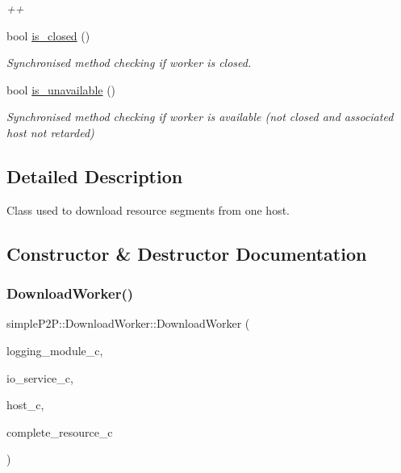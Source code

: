 \begin{DoxyCompactItemize}
\begin{DoxyCompactList}\small\item\em ++ \end{DoxyCompactList}\item 
\mbox{\label{classsimpleP2P_1_1DownloadWorker_a5e46b7b54882ef35bfaf48b51573a96e}} 
bool \hyperlink{classsimpleP2P_1_1DownloadWorker_a5e46b7b54882ef35bfaf48b51573a96e}{is\+\_\+closed} ()
\begin{DoxyCompactList}\small\item\em Synchronised method checking if worker is closed. \end{DoxyCompactList}\item 
bool \hyperlink{classsimpleP2P_1_1DownloadWorker_a73743cf5fe1e579bc7cf0e5acb504450}{is\+\_\+unavailable} ()
\begin{DoxyCompactList}\small\item\em Synchronised method checking if worker is available (not closed and associated host not retarded) \end{DoxyCompactList}\end{DoxyCompactItemize}


\subsection{Detailed Description}
Class used to download resource segments from one host. 

\subsection{Constructor \& Destructor Documentation}
\mbox{\label{classsimpleP2P_1_1DownloadWorker_a2861145541d88a86bf3b082e5272d1d8}} 
\subsubsection{\texorpdfstring{Download\+Worker()}{DownloadWorker()}}
{\footnotesize\ttfamily simple\+P2\+P\+::\+Download\+Worker\+::\+Download\+Worker (\begin{DoxyParamCaption}\item[{\hyperlink{classsimpleP2P_1_1LoggingModule}{Logging\+Module} \&}]{logging\+\_\+module\+\_\+c,  }\item[{boost\+::asio\+::io\+\_\+service \&}]{io\+\_\+service\+\_\+c,  }\item[{std\+::shared\+\_\+ptr$<$ \hyperlink{classsimpleP2P_1_1Host}{Host} $>$}]{host\+\_\+c,  }\item[{std\+::shared\+\_\+ptr$<$ \hyperlink{classsimpleP2P_1_1CompleteResource}{Complete\+Resource} $>$}]{complete\+\_\+resource\+\_\+c }\end{DoxyParamCaption})}



